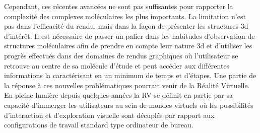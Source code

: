 Cependant, ces récentes avancées ne sont pas suffisantes pour rapporter la complexité des complexes moléculaires les plus importants. La limitation n'est pas dans l'efficacité du rendu, mais dans la façon de présenter les structures 3d d'intérêt. Il est nécessaire de passer un palier dans les habitudes d'observation de structures moléculaires afin de prendre en compte leur nature 3d et d'utiliser les progrès effectués dans des domaines de rendus graphiques où l'utilisateur se retrouve au centre de sa molécule d'étude et peut accéder aux différentes informations la caractérisant en un minimum de temps et d'étapes. Une partie de la réponse à ces nouvelles problématiques pourrait venir de la Réalité Virtuelle. En pleine lumière depuis quelques années la RV se définit en partie par sa capacité d'immerger les utilisateurs au sein de mondes virtuels où les possibilités d'interaction et d'exploration visuelle sont décuplés par rapport aux configurations de travail standard type ordinateur de bureau.









